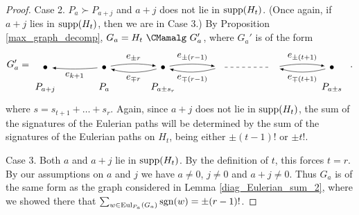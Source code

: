 \documentclass{amsproc}
\theoremstyle{definition}
\theoremstyle{remark}
\numberwithin{equation}{section}
\newcommand{\sgn}{{\rm sgn}}
\newcommand{\nodeDist}{2}
\newcommand{\supp}{{\rm supp}}
\newcommand{\uni}{{\rm Eul}}
\begin{document}
\begin{proof}
\smallskip
Case 2. $P_{a}\succ P_{a+j}$ and $a+ j$ does not lie in $\supp(H_t)$. (Once again, if $a + j$ lies in $\supp(H_t)$, then we are in Case 3.)
By Proposition \ref{max_graph_decomp}, $G_a=H_t\ \CMamalg\ G_a'$, where $G_a'$ is of the form
\[G_a'=
\begin{tikzpicture}[baseline,vertex/.style={anchor=base, circle, fill,minimum size=4pt, inner sep=0pt, outer sep=0pt},auto,
                               edge/.style={->,>=latex, shorten > = 5pt,shorten < = 5pt},
position/.style args={#1:#2 from #3}{
    at=(#3.#1), anchor=#1+180, shift=(#1:#2)
}]
  \node[vertex] (v1) {};
  \node[vertex,position = 0:{\nodeDist} from v1] (v2) {};
  \node[vertex,position = 0:{\nodeDist} from v2] (v3) {};
  \coordinate[position = 0:{\nodeDist} from v3] (v4);
  \coordinate[position = 0:{\nodeDist} from v4] (v5) {};
  \node[vertex,position = 0:{\nodeDist} from v5] (v6) {};

  \draw (v1) node[below = 13] {$P_{a+j}$};
  \draw (v2) node[below = 13] {$P_{a}$};
  \draw (v3) node[below = 13] {$P_{a\pm s_{r}}$};
  \draw (v6) node[below = 13] {$P_{a\pm s}$};

  \draw[edge] (v2) to [bend left=5] node[below] {$e_{k+1}$} (v1);

  \draw[edge] (v2) to [bend left=10] node[above] {$e_{\pm r}$} (v3);
  \draw[edge] (v3) to [bend left=15] node[below] {$e_{\mp r}$} (v2);

  \draw[edge] (v3) to [bend left=10] node[above] {$e_{\pm (r-1)}$} (v4);
  \draw[edge] (v4) to [bend left=15] node[below] {$e_{\mp (r-1)}$} (v3);

  \draw[dashed,shorten > = 5pt, shorten < = 5pt] (v4) -- (v5);

  \draw[edge] (v5) to [bend left=10] node[above] {$e_{\pm (t+1)}$} (v6);
  \draw[edge] (v6) to [bend left=15] node[below] {$e_{\mp (t + 1)}$} (v5);
\end{tikzpicture}\enskip .
\]
where $s=s_{t+1}+\dots+s_r$. Again, since $a+j$ does not lie in $\supp(H_t)$, the sum of the signatures of the Eulerian paths 
will be determined by the sum of the signatures of the Eulerian paths on $H_t$, being either $\pm (t-1)!$ or $\pm t!$.

\smallskip
Case 3. Both $a$ and $a+j$ lie in $\supp(H_t)$. By the definition of $t$, this forces $t=r$. By our assumptions on $a$ and $j$ 
we have $a \neq 0$, $j \neq 0$ and $a + j\neq 0$. Thus $G_a$ is of the same form as the graph considered in Lemma \ref{diag_Eulerian_sum_2}, 
where we showed there that $\sum_{w\in \uni_{P_a}(G_a)}\sgn(w)=\pm (r-1)!$.
\end{proof}
\end{document}

